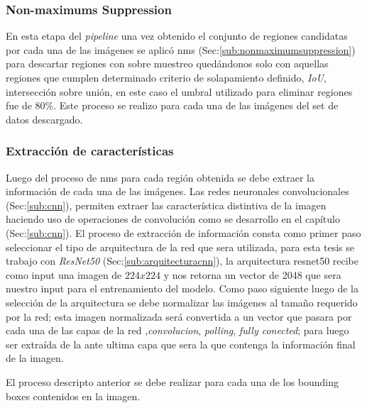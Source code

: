 \subsubsection*{Non-maximums Suppression}

En esta etapa del \textit{pipeline} una vez obtenido el conjunto de regiones candidatas por cada una de las imágenes se aplicó \ac{nms} (Sec:\ref{sub:nonmaximumsuppression}) para descartar regiones con sobre muestreo quedándonos solo con aquellas regiones que cumplen determinado criterio de solapamiento definido, \textit{IoU}, intersección sobre unión, en este caso el umbral utilizado para eliminar regiones fue de 80\%. Este proceso se realizo para cada una de las imágenes del set de datos descargado.


\subsubsection*{Extracción de características}
Luego del proceso de \ac{nms} para cada región obtenida se debe extraer la información de cada una de las imágenes. Las redes neuronales convolucionales (Sec:\ref{sub:cnn}), permiten extraer las característica distintiva de la imagen haciendo uso de operaciones de convolución como se desarrollo en el capítulo (Sec:\ref{sub:cnn}). El proceso de extracción de información consta como primer paso seleccionar el tipo de arquitectura de la red que sera utilizada, para esta tesis se trabajo con \textit{ResNet50} (Sec:\ref{sub:arquitecturacnn}), la arquitectura  resnet50 recibe como input una imagen de $224 x 224$ y nos retorna un vector de 2048 que sera nuestro input para el entrenamiento del modelo.
Como paso siguiente luego de la selección de la arquitectura se debe normalizar las imágenes al tamaño requerido por la red; esta imagen normalizada será convertida a un vector que pasara por cada una de las capas de la red ,\textit{convolucion}, \textit{polling}, \textit{fully conected}; para luego ser extraída de la ante ultima capa que sera la que contenga la información final de la imagen.

El proceso descripto anterior se debe realizar para cada una de los bounding boxes contenidos en la imagen.





